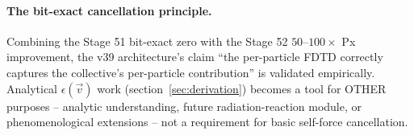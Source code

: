 \documentclass[11pt,a4paper]{article}
\begin{document}
\paragraph{The bit-exact cancellation principle.}  Combining the
Stage 51 bit-exact zero with the Stage 52 $50$--$100\times$ Px
improvement, the v39 architecture's claim ``the per-particle FDTD
correctly captures the collective's per-particle contribution''
is validated empirically.  Analytical $\epsilon(\vec v)$ work
(section~\ref{sec:derivation}) becomes a tool for OTHER purposes --
analytic understanding, future radiation-reaction module, or
phenomenological extensions -- not a requirement for basic self-force
cancellation.
\end{document}
